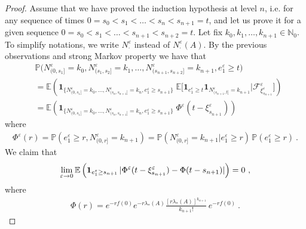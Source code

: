 \documentclass[reqno, 12pt, a4paper]{amsart}
\theoremstyle{plain}
\theoremstyle{definition}
\begin{document}
\begin{proof}
\medskip
Assume that we have proved the induction hypothesis at level $n$, i.e. for any sequence of times $0=s_0<s_1< \ldots<s_n<s_{n+1}=t$, and let us prove it for a given sequence $0=s_0 < s_1< \ldots< s_{n+1}<s_{n+2}=t$. Let fix $k_0,k_1, \ldots, k_{n+1} \in \mathbb N_0$. To simplify notations, we write $N_\cdot^\varepsilon$ instead of $N_\cdot^\varepsilon (A)$. By the previous observations and strong Markov property we have that
\begin{equation}
\begin{split}
&\mathbb P \Big (N_{(0,s_1]}^\varepsilon =k_0, N^\varepsilon_{(s_1,s_2]} = k_1, \ldots,  N^\varepsilon_{(s_{n+1},s_{n+2}]} = k_{n+1}, e_1^{\varepsilon} \ge t \Big)\\
&= \mathbb E \left( {\mathbf 1}_{ \{ N_{(0,s_1]}^\varepsilon =k_0, \ldots,  N^\varepsilon_{(s_{n},s_{n+1}]} = k_{n}, e_1^{\varepsilon} \ge s_{n+1} \}  } \; \mathbb E \Big[ {\mathbf 1}_{e_1^\varepsilon \ge t} {\mathbf 1}_{N^\varepsilon_{(s_{n+1},t]}= k_{n+1}} \vert {\mathcal F}^\varepsilon_{\xi_{s_{n+1}}^\varepsilon}  \Big] \right) \\
&= \mathbb E \left( {\mathbf 1}_{ \{ N_{(0,s_1]}^\varepsilon =k_0, \ldots,  N^\varepsilon_{(s_{n},s_{n+1}]} = k_{n}, e_1^{\varepsilon} \ge s_{n+1} \}  } \;  \Phi^\varepsilon (t-\xi_{s_{n+1}}^\varepsilon)\right)
\end{split}
\end{equation}
where 
\begin{equation}
\begin{split}
\Phi^\varepsilon (r) =\mathbb P ( e_1^\varepsilon \ge r, N^\varepsilon_{(0,r]} = k_{n+1}) =\mathbb P ( N^\varepsilon_{(0,r]}= k_{n+1} \vert e_1^\varepsilon \ge r)\, \mathbb P (e_1^\varepsilon \ge r) \ . 
\end{split}
\end{equation}
We claim that 
\begin{equation}
\label{eq:claim222}
\begin{split}
\lim_{\varepsilon \to 0} \mathbb E  \left( {\bf 1}_{e_1^\varepsilon \ge s_{n+1}} \,  \vert \Phi^\varepsilon (t-\xi_{s_{n+1}}^\varepsilon) - \Phi (t -s_{n+1}) \vert \right) =0 \ ,
\end{split}
\end{equation}
where 
\begin{equation}
\begin{split}
\Phi (r) = e^{- r f(0)} e^{- r \lambda_* (A)} \frac{[ r \lambda_* (A)]^{k_{n+1}}}{k_{n+1} !}\, e^{-r f(0)} \ .
\end{split}

\end{equation}
\end{proof}
\end{document}
